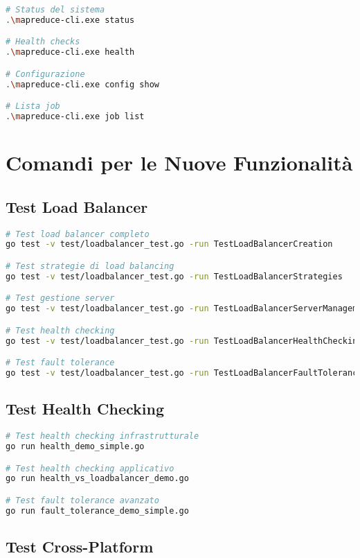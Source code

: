 \documentclass[12pt,a4paper]{article}
\begin{document}
\begin{lstlisting}[language=bash]
# Status del sistema
.\mapreduce-cli.exe status

# Health checks
.\mapreduce-cli.exe health

# Configurazione
.\mapreduce-cli.exe config show

# Lista job
.\mapreduce-cli.exe job list
\end{lstlisting}

\section{Comandi per le Nuove Funzionalità}

\subsection{Test Load Balancer}

\begin{lstlisting}[language=bash]
# Test load balancer completo
go test -v test/loadbalancer_test.go -run TestLoadBalancerCreation

# Test strategie di load balancing
go test -v test/loadbalancer_test.go -run TestLoadBalancerStrategies

# Test gestione server
go test -v test/loadbalancer_test.go -run TestLoadBalancerServerManagement

# Test health checking
go test -v test/loadbalancer_test.go -run TestLoadBalancerHealthChecking

# Test fault tolerance
go test -v test/loadbalancer_test.go -run TestLoadBalancerFaultTolerance
\end{lstlisting}

\subsection{Test Health Checking}

\begin{lstlisting}[language=bash]
# Test health checking infrastrutturale
go run health_demo_simple.go

# Test health checking applicativo
go run health_vs_loadbalancer_demo.go

# Test fault tolerance avanzato
go run fault_tolerance_demo_simple.go
\end{lstlisting}

\subsection{Test Cross-Platform}
\end{document}
